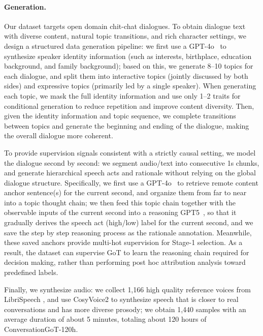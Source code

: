 \paragraph{Generation.}Our dataset targets open domain chit-chat dialogues. To obtain dialogue text with diverse content, natural topic transitions, and rich character settings, we design a structured data generation pipeline: we first use a GPT-4o~\cite{openai2024gpt4ocard} to synthesize speaker identity information (such as interests, birthplace, education background, and family background); based on this, we generate 8–10 topics for each dialogue, and split them into interactive topics (jointly discussed by both sides) and expressive topics (primarily led by a single speaker). When generating each topic, we mask the full identity information and use only 1–2 traits for conditional generation to reduce repetition and improve content diversity. Then, given the identity information and topic sequence, we complete transitions between topics and generate the beginning and ending of the dialogue, making the overall dialogue more coherent.

To provide supervision signals consistent with a strictly causal setting, we model the dialogue second by second: we segment audio/text into consecutive 1s chunks, and generate hierarchical speech acts and rationale without relying on the global dialogue structure. Specifically, we first use a GPT-4o~\cite{openai2024gpt4ocard} to retrieve remote content anchor sentence(s) for the current second, and organize them from far to near into a topic thought chain; we then feed this topic chain together with the observable inputs of the current second into a reasoning GPT5~\cite{singh2025openaigpt5card}, so that it gradually derives the speech act (high/low) label for the current second, and we save the step by step reasoning process as the rationale annotation. Meanwhile, these saved anchors provide multi-hot supervision for Stage-1 selection. As a result, the dataset can supervise GoT to learn the reasoning chain required for decision making, rather than performing post hoc attribution analysis toward predefined labels. 

Finally, we synthesize audio: we collect 1,166 high quality reference voices from LibriSpeech \citep{panayotov2015librispeech}, and use CosyVoice2 \citep{du2024cosyvoice} to synthesize speech that is closer to real conversations and has more diverse prosody; we obtain 1,440 samples with an average duration of about 5 minutes, totaling about 120 hours of ConversationGoT-120h.

